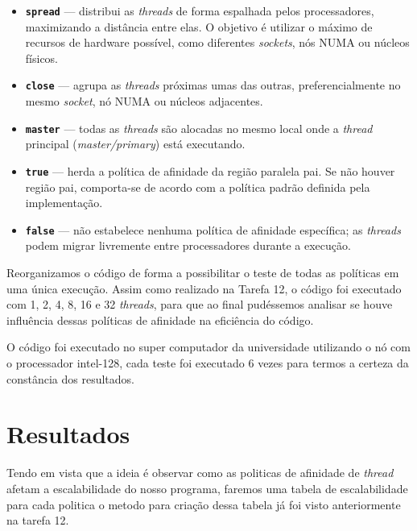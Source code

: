 \documentclass[a4paper, 12pt]{article}
\begin{document}
	\begin{itemize}
		\item \textbf{\texttt{spread}} — distribui as \textit{threads} de forma espalhada pelos processadores, maximizando a distância entre elas. O objetivo é utilizar o máximo de recursos de hardware possível, como diferentes \textit{sockets}, nós NUMA ou núcleos físicos.
		
		\item \textbf{\texttt{close}} — agrupa as \textit{threads} próximas umas das outras, preferencialmente no mesmo \textit{socket}, nó NUMA ou núcleos adjacentes.
		
		\item \textbf{\texttt{master}} — todas as \textit{threads} são alocadas no mesmo local onde a \textit{thread} principal (\textit{master/primary}) está executando.
		
		\item \textbf{\texttt{true}} — herda a política de afinidade da região paralela pai. Se não houver região pai, comporta-se de acordo com a política padrão definida pela implementação.
		
		\item \textbf{\texttt{false}} — não estabelece nenhuma política de afinidade específica; as \textit{threads} podem migrar livremente entre processadores durante a execução.
	\end{itemize}
	
	\hspace{0.62cm}Reorganizamos o código de forma a possibilitar o teste de todas as políticas em uma única execução. Assim como realizado na Tarefa 12, o código foi executado com 1, 2, 4, 8, 16 e 32 \textit{threads}, para que ao final pudéssemos analisar se houve influência dessas políticas de afinidade na eficiência do código.
	
	O código foi executado no super computador da universidade utilizando o nó com o processador intel-128, cada teste foi executado 6 vezes para termos a certeza da constância dos resultados.
	
	\section{Resultados}
	Tendo em vista que a ideia é observar como as politicas de afinidade de \textit{thread} afetam a escalabilidade do nosso programa, faremos uma tabela de escalabilidade para cada politica o metodo para criação dessa tabela já foi visto anteriormente na tarefa 12.
	
\end{document}
